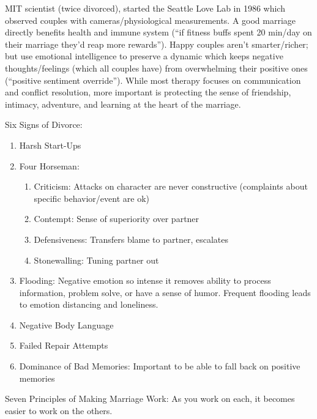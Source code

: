 \documentclass[
]{article}
\begin{document}
MIT scientist (twice divorced), started the Seattle Love Lab in 1986
which observed couples with cameras/physiological measurements. A good
marriage directly benefits health and immune system (``if fitness buffs
spent 20 min/day on their marriage they'd reap more rewards''). Happy
couples aren't smarter/richer; but use emotional intelligence to
preserve a dynamic which keeps negative thoughts/feelings (which all
couples have) from overwhelming their positive ones (``positive
sentiment override''). While most therapy focuses on communication and
conflict resolution, more important is protecting the sense of
friendship, intimacy, adventure, and learning at the heart of the
marriage.

Six Signs of Divorce:

\begin{enumerate}
\def\labelenumi{\arabic{enumi}.}
\item
  Harsh Start-Ups
\item
  Four Horseman:

  \begin{enumerate}
  \def\labelenumii{\arabic{enumii}.}
  \item
    Criticism: Attacks on character are never constructive (complaints
    about specific behavior/event are ok)
  \item
    Contempt: Sense of superiority over partner
  \item
    Defensiveness: Transfers blame to partner, escalates
  \item
    Stonewalling: Tuning partner out
  \end{enumerate}
\item
  Flooding: Negative emotion so intense it removes ability to process
  information, problem solve, or have a sense of humor. Frequent
  flooding leads to emotion distancing and loneliness.
\item
  Negative Body Language
\item
  Failed Repair Attempts
\item
  Dominance of Bad Memories: Important to be able to fall back on
  positive memories
\end{enumerate}

Seven Principles of Making Marriage Work: As you work on each, it
becomes easier to work on the others.
\end{document}
